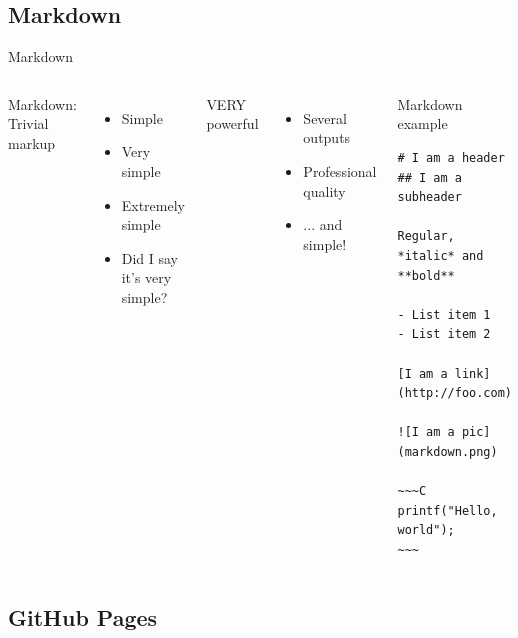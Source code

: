 \documentclass[10pt,compress]{beamer} %
\begin{document}
\subsection{Markdown}
\begin{frame}[fragile]{Markdown}
	\vspace{-0.3cm}
	\begin{columns}
	Markdown: Trivial markup
	\begin{itemize}
		\item Simple
		\item Very simple
		\item Extremely simple
		\item Did I say it's very simple?
	\end{itemize}
	VERY powerful
	\begin{itemize}
		\item Several outputs
		\item Professional quality
		\item ... and simple!
	\end{itemize}
		\begin{exampleblock}{Markdown example}
			\vspace{-0.3cm}
			\begin{lstlisting}[mathescape]
# I am a header
## I am a subheader

Regular, *italic* and **bold**

- List item 1
- List item 2

[I am a link](http://foo.com)

![I am a pic](markdown.png)

~~~C
printf("Hello, world");
~~~
			\end{lstlisting}
			\vspace{-0.2cm}
		\end{exampleblock}
	\end{columns}
\end{frame}

\subsection{GitHub Pages}
\end{document}
